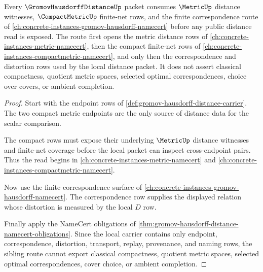 \begin{theorem}
\label{thm:gromov-hausdorff-distance-sibling-route}
Every $\GromovHausdorffDistanceUp$ packet consumes $\MetricUp$ distance witnesses, $\CompactMetricUp$ finite-net rows, and the finite correspondence route of \autoref{ch:concrete-instances-gromov-hausdorff-namecert} before any public distance read is exposed. The route first opens the metric distance rows of \autoref{ch:concrete-instances-metric-namecert}, then the compact finite-net rows of \autoref{ch:concrete-instances-compactmetric-namecert}, and only then the correspondence and distortion rows used by the local distance packet. It does not assert classical compactness, quotient metric spaces, selected optimal correspondences, choice over covers, or ambient completion.
\end{theorem}
\begin{proof}
Start with the endpoint rows of \autoref{def:gromov-hausdorff-distance-carrier}. The two compact metric endpoints are the only source of distance data for the scalar comparison.

The compact rows must expose their underlying $\MetricUp$ distance witnesses and finite-net coverage before the local packet can inspect cross-endpoint pairs. Thus the read begins in \autoref{ch:concrete-instances-metric-namecert} and \autoref{ch:concrete-instances-compactmetric-namecert}.

Now use the finite correspondence surface of \autoref{ch:concrete-instances-gromov-hausdorff-namecert}. The correspondence row supplies the displayed relation whose distortion is measured by the local $D$ row.

Finally apply the NameCert obligations of \autoref{thm:gromov-hausdorff-distance-namecert-obligations}. Since the local carrier contains only endpoint, correspondence, distortion, transport, replay, provenance, and naming rows, the sibling route cannot export classical compactness, quotient metric spaces, selected optimal correspondences, cover choice, or ambient completion.
\end{proof}
